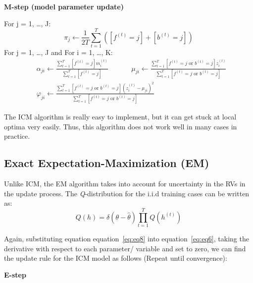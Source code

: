 \documentclass{article} %
\begin{document}
\textbf{M-step (model parameter update)}

For j = 1, \ldots , J: 
\begin{equation*}
\pi_j \leftarrow \frac{1}{2T}\sum_{t=1}^T([f^{(t)} = j] + [b^{(t)} = j])
\end{equation*}
For j = 1, \ldots , J and For i = 1, \ldots , K: 
\begin{align*} 
&\alpha_{ji} \leftarrow \frac{\sum_{t=1}^T [f^{(t)} = j]m_i^{(t)}}{\sum_{t=1}^T [f^{(t)} = j]} \text{ }\text{ }\text{ }\text{ }\text{ }\mu_{ji} \leftarrow \frac{\sum_{t=1}^T [f^{(t)} = j \text{ or } b^{(t)} = j ]z_i^{(t)}}{\sum_{t=1}^T [f^{(t)} = j \text{ or } b^{(t)} = j]} \\
&\varphi_{ji} \leftarrow \frac{\sum_{t=1}^T [f^{(t)} = j \text{ or } b^{(t)} = j ](z_i^{(t)}-\mu_{ji})^2}{\sum_{t=1}^T [f^{(t)} = j \text{ or } b^{(t)} = j]} 
\end{align*} 

The ICM algorithm is really easy to implement, but it can get stuck at local optima very easily. Thus, this algorithm does not work well in many cases in practice.

\subsection{Exact Expectation-Maximization (EM)}
\label{exact_em}

Unlike ICM, the EM algorithm takes into account for uncertainty in the RVs in the update process. The \textit{Q}-distribution for the i.i.d training cases can be written as:
\begin{equation}
Q(h) = \delta(\theta-\hat{\theta})\prod_{t=1}^TQ(h^{(t)})
\label{eq:eq8}
\end{equation}

Again, substituting equation equation~\ref{eq:eq8} into equation~\ref{eq:eq6}, taking the derivative with respect to each parameter/ variable and set to zero, we can find the update rule for the ICM model as follows (Repeat until convergence):

\textbf{E-step}
\end{document}
